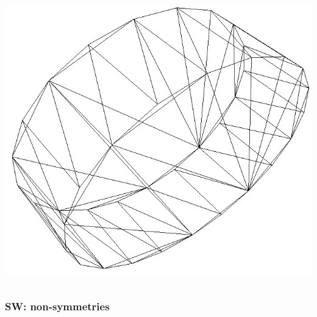 \documentclass[xcolor=pdftex,table,10pt]{beamer}
\begin{document}
\begin{frame}
\begin{columns}
\begin{column}{4cm}
\begin{center}
            \includegraphics[width=1.0\textwidth]{cylinder.jpg}
            \end{center}
        \end{column}
        \end{columns}

    \end{frame}

	\begin{frame}
		\frametitle{SW: non-symmetries}

		\begin{center}
		    
		\end{center}

	\end{frame}
	
\end{document}
